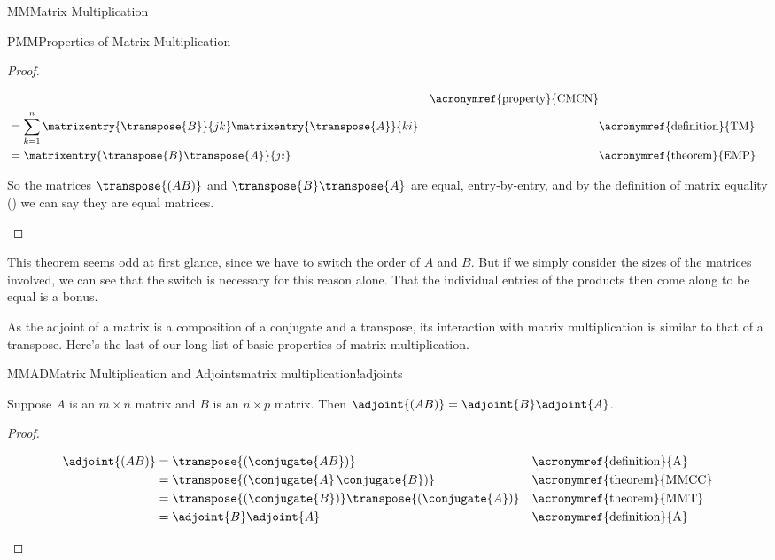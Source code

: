 \begin{subsect}{MM}{Matrix Multiplication}
\begin{subsect}{PMM}{Properties of Matrix Multiplication}
\begin{proof}
\begin{para}
\begin{align*}
&&\text{\acronymref{property}{CMCN}}\\
%
&=\sum_{k=1}^{n}\matrixentry{\transpose{B}}{jk}\matrixentry{\transpose{A}}{ki}
&&\text{\acronymref{definition}{TM}}\\
%
&=\matrixentry{\transpose{B}\transpose{A}}{ji}
&&\text{\acronymref{theorem}{EMP}}
%
\end{align*}
\end{para}
%
\begin{para}So the matrices $\transpose{(AB)}$ and $\transpose{B}\transpose{A}$ are equal, entry-by-entry, and by the definition of matrix equality () we can say they are equal matrices.\end{para}
%
\end{proof}
%
\begin{para}This theorem seems odd at first glance, since we have to switch the order of $A$ and $B$.  But if we simply consider the sizes of the matrices involved, we can see that the switch is necessary for this reason alone.  That the individual entries of the products then come along to be equal is a bonus.\end{para}
%
\begin{para}As the adjoint of a matrix is a composition of a conjugate and a transpose, its interaction with matrix multiplication is similar to that of a transpose.  Here's the last of our long list of basic properties of matrix multiplication.\end{para}
%
\begin{theorem}{MMAD}{Matrix Multiplication and Adjoints}{matrix multiplication!adjoints}
\begin{para}Suppose $A$ is an $m\times n$ matrix and $B$ is an $n\times p$ matrix.  Then $\adjoint{(AB)}=\adjoint{B}\adjoint{A}$.\end{para}
\end{theorem}
%
\begin{proof}
%
\begin{para}
\begin{align*}
\adjoint{(AB)}
&=\transpose{\left(\conjugate{AB}\right)}&&\text{\acronymref{definition}{A}}\\
&=\transpose{\left(\conjugate{A}\,\conjugate{B}\right)}&&\text{\acronymref{theorem}{MMCC}}\\
&=\transpose{\left(\conjugate{B}\right)}\transpose{\left(\conjugate{A}\right)}&&\text{\acronymref{theorem}{MMT}}\\
&=\adjoint{B}\adjoint{A}&&\text{\acronymref{definition}{A}}
\end{align*}

\end{para}
\end{proof}
\end{subsect}
\end{subsect}
